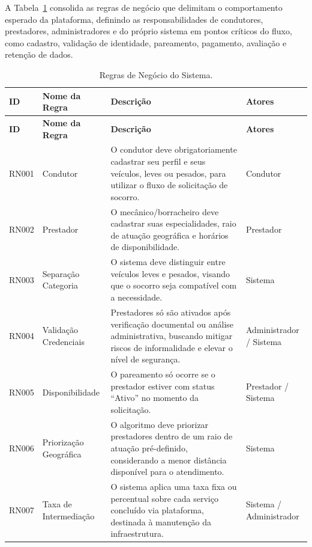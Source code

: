 \documentclass[12pt, a4paper]{article}
\begin{document}
A Tabela~\ref{tab:regras-negocio} consolida as regras de negócio que delimitam o comportamento esperado da plataforma, definindo as responsabilidades de condutores, prestadores, administradores e do próprio sistema em pontos críticos do fluxo, como cadastro, validação de identidade, pareamento, pagamento, avaliação e retenção de dados.

{\footnotesize
\setlength{\tabcolsep}{3pt}
\renewcommand{\arraystretch}{1.15}
\begin{longtable}{|>{\raggedright\arraybackslash}p{}|>{\raggedright\arraybackslash}p{}|>{\raggedright\arraybackslash}p{}|>{\raggedright\arraybackslash}p{}|}
\caption{Regras de Negócio do Sistema.}
\label{tab:regras-negocio} \\
\hline
\textbf{ID} & \textbf{Nome da Regra} & \textbf{Descrição} & \textbf{Atores} \\ \hline
\endfirsthead
\hline
\textbf{ID} & \textbf{Nome da Regra} & \textbf{Descrição} & \textbf{Atores} \\ \hline
\endhead
RN001 & Condutor & O condutor deve obrigatoriamente cadastrar seu perfil e seus veículos, leves ou pesados, para utilizar o fluxo de solicitação de socorro. & Condutor \\ \hline
RN002 & Prestador & O mecânico/borracheiro deve cadastrar suas especialidades, raio de atuação geográfica e horários de disponibilidade. & Prestador \\ \hline
RN003 & Separação Categoria & O sistema deve distinguir entre veículos leves e pesados, visando que o socorro seja compatível com a necessidade. & Sistema \\ \hline
RN004 & Validação Credenciais & Prestadores só são ativados após verificação documental ou análise administrativa, buscando mitigar riscos de informalidade e elevar o nível de segurança. & Administrador / Sistema \\ \hline
RN005 & Disponibilidade & O pareamento só ocorre se o prestador estiver com status ``Ativo'' no momento da solicitação. & Prestador / Sistema \\ \hline
RN006 & Priorização Geográfica & O algoritmo deve priorizar prestadores dentro de um raio de atuação pré-definido, considerando a menor distância disponível para o atendimento. & Sistema \\ \hline
RN007 & Taxa de Intermediação & O sistema aplica uma taxa fixa ou percentual sobre cada serviço concluído via plataforma, destinada à manutenção da infraestrutura. & Sistema / Administrador \\ \hline

\end{longtable}}
\end{document}
